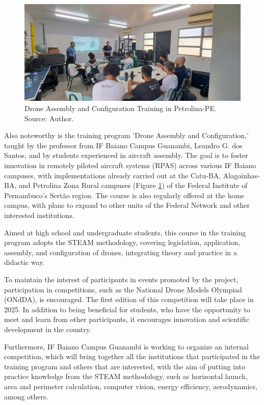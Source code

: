 \documentclass[conference]{IEEEtran}
\begin{document}
\begin{figure}[!htb]
    \centering
    \includegraphics[scale=0.12]{img/petrolina.jpg} 
    \caption{Drone Assembly and Configuration Training in Petrolina-PE. Source: Author.}
    \label{fig:petrolina}
\end{figure}

Also noteworthy is the training program 'Drone Assembly and Configuration,' taught by the professor from IF Baiano Campus Guanambi, Leandro G. dos Santos, and by students experienced in aircraft assembly. The goal is to foster innovation in remotely piloted aircraft systems (RPAS) across various IF Baiano campuses, with implementations already carried out at the Catu-BA, Alagoinhas-BA, and Petrolina Zona Rural campuses (Figure \ref{fig:petrolina}) of the Federal Institute of Pernambuco’s Sertão region. The course is also regularly offered at the home campus, with plans to expand to other units of the Federal Network and other interested institutions.

Aimed at high school and undergraduate students, this course in the training program adopts the STEAM methodology, covering legislation, application, assembly, and configuration of drones, integrating theory and practice in a didactic way.

To maintain the interest of participants in events promoted by the project, participation in competitions, such as the National Drone Models Olympiad (ONdDA), is encouraged. The first edition of this competition will take place in 2025. In addition to being beneficial for students, who have the opportunity to meet and learn from other participants, it encourages innovation and scientific development in the country.

Furthermore, IF Baiano Campus Guanambi is working to organize an internal competition, which will bring together all the institutions that participated in the training program and others that are interested, with the aim of putting into practice knowledge from the STEAM methodology, such as horizontal launch, area and perimeter calculation, computer vision, energy efficiency, aerodynamics, among others.
\end{document}
